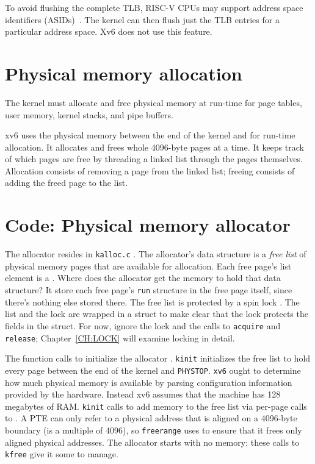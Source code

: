 To avoid flushing the complete TLB, RISC-V CPUs may support address
space identifiers (ASIDs)~\cite{riscv:priv}.  The kernel can then
flush just the TLB entries for a particular address space. Xv6
does not use this feature.

\section{Physical memory allocation}

The kernel must allocate and free physical memory at run-time for
page tables,
user memory,
kernel stacks,
and pipe buffers.

xv6 uses the physical memory between the end of the kernel and
for run-time allocation. It allocates and frees whole 4096-byte pages
at a time. It keeps track of which pages are free by threading a
linked list through the pages themselves. Allocation consists of
removing a page from the linked list; freeing consists of adding the
freed page to the list.
\section{Code: Physical memory allocator}

The allocator resides in {\tt kalloc.c} .
The allocator's data structure is a
\textit{free list}
of physical memory pages that are available
for allocation.
Each free page's list element is a
.
Where does the allocator get the memory
to hold that data structure?
It store each free page's
\lstinline{run}
structure in the free page itself,
since there's nothing else stored there.
The free list is
protected by a spin lock
.
The list and the lock are wrapped in a struct
to make clear that the lock protects the fields
in the struct.
For now, ignore the lock and the calls to
\lstinline{acquire}
and
\lstinline{release};
Chapter~\ref{CH:LOCK} will examine
locking in detail.

The function
calls
to initialize the allocator
.
\lstinline{kinit}
initializes the free list to hold
every page between the end of the kernel and {\tt PHYSTOP}.
\lstinline{xv6}
ought to determine how much physical
memory is available by parsing configuration information 
provided by the hardware.
Instead xv6 assumes that the machine has
128 megabytes of RAM.
\lstinline{kinit}
calls
to add memory to the free list via per-page calls to
.
A PTE can only refer to a physical address that is aligned
on a 4096-byte boundary (is a multiple of 4096), so
\lstinline{freerange}
uses
to ensure that it frees only aligned physical addresses.
The allocator starts with no memory;
these calls to
\lstinline{kfree}
give it some to manage.

